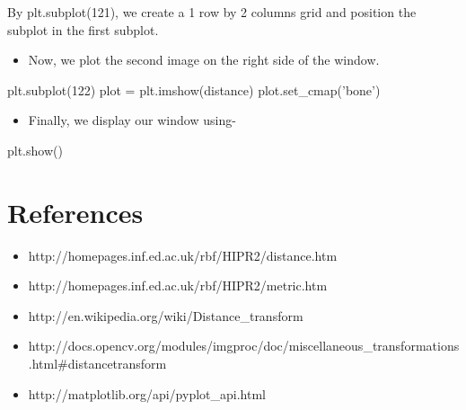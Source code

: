 \documentclass[]{article}
\newenvironment{Shaded}{}{}
\newcommand{\DecValTok}[1]{\textcolor[rgb]{0.25,0.63,0.44}{{#1}}}
\newcommand{\StringTok}[1]{\textcolor[rgb]{0.25,0.44,0.63}{{#1}}}
\newcommand{\OperatorTok}[1]{\textcolor[rgb]{0.40,0.40,0.40}{{#1}}}
\newcommand{\NormalTok}[1]{{#1}}
\providecommand{\tightlist}{%
  \setlength{\itemsep}{0pt}\setlength{\parskip}{0pt}}
\begin{document}
By plt.subplot(121), we create a 1 row by 2 columns grid and position
the subplot in the first subplot.

\begin{itemize}
\tightlist
\item
  Now, we plot the second image on the right side of the window.
\end{itemize}

\begin{Shaded}
\begin{Highlighting}[]
    \NormalTok{plt.subplot(}\DecValTok{122}\NormalTok{)}
    \NormalTok{plot }\OperatorTok{=} \NormalTok{plt.imshow(distance)}
    \NormalTok{plot.set_cmap(}\StringTok{'bone'}\NormalTok{)}
\end{Highlighting}
\end{Shaded}

\begin{itemize}
\tightlist
\item
  Finally, we display our window using-
\end{itemize}

\begin{Shaded}
\begin{Highlighting}[]
    \NormalTok{plt.show()}
\end{Highlighting}
\end{Shaded}

\section{References}\label{references}

\begin{itemize}
\tightlist
\item
  http://homepages.inf.ed.ac.uk/rbf/HIPR2/distance.htm
\item
  http://homepages.inf.ed.ac.uk/rbf/HIPR2/metric.htm
\item
  http://en.wikipedia.org/wiki/Distance\_transform
\item
  http://docs.opencv.org/modules/imgproc/doc/miscellaneous\_transformations.html\#distancetransform
\item
  http://matplotlib.org/api/pyplot\_api.html
\end{itemize}
\end{document}
